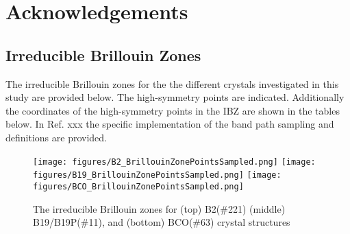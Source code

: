 \documentclass[preprint]{elsarticle}
\begin{document}
\section*{Acknowledgements}

\appendix
\subsection{Irreducible Brillouin Zones}
\label{sec:appx_ibz}

The irreducible Brillouin zones for the the different crystals investigated in this study are provided below. The high-symmetry points are indicated. Additionally the coordinates of the high-symmetry points in the IBZ are shown in the tables below. In Ref. xxx the  specific implementation of the band path sampling and definitions are provided.

\begin{figure}[ht!]                                                                                      
    \begin{centering}                                                                                    
      \texttt{[image: figures/B2\_BrillouinZonePointsSampled.png]} 
      \vspace{1mm}                                                                                       
      \texttt{[image: figures/B19\_BrillouinZonePointsSampled.png]}
      \vspace{1mm}
      \texttt{[image: figures/BCO\_BrillouinZonePointsSampled.png]}
      \vspace{1mm}                                                                                       
      \caption{The irreducible Brillouin zones for (top) B2(\#221) (middle) B19/B19P(\#11), and (bottom) BCO(\#63) crystal structures}                                                                                  \label{fig:ibz}                                                                          
    \end{centering}                                                                                      
\end{figure} 

\end{document}
